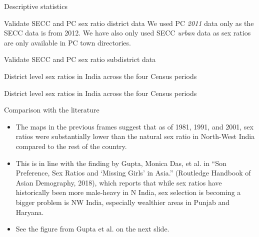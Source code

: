 \documentclass[aspectratio=169]{beamer}
\begin{document}
\begin{section}{Descriptive statistics}
  \begin{frame}{Validate SECC and PC sex ratio district data}
    \small{We used PC \emph{2011} data only as the SECC data is from 2012. We
    have also only used SECC \emph{urban} data as sex ratios are only
    available in PC town directories.}
    \centering
  \end{frame}
  \begin{frame}{Validate SECC and PC sex ratio subdistrict data}
    \centering
  \end{frame}

\begin{frame}{District level sex ratios in India across the four Census periods}
  \centering
  \end{frame}
\begin{frame}{District level sex ratios in India across the four Census periods}
  \centering
\end{frame}

\begin{frame}{Comparison with the literature}
  \begin{itemize}
    \item The maps in the previous frames suggest that as of 1981, 1991, and
  2001, sex ratios were substantially lower than the natural sex ratio
  in North-West India compared to the rest of the country.
  \item This is in line with the finding by Gupta, Monica Das, et al. in “Son Preference,
  Sex Ratios and ‘Missing Girls’ in Asia.” (Routledge Handbook of Asian
  Demography, 2018), which reports that while sex ratios have
  historically been more male-heavy in N India, sex selection is
  becoming a bigger problem is NW India, especially wealthier areas in
  Punjab and Haryana.
  \item See the figure from Gupta et al. on the next slide.
   \end{itemize}
\end{frame}


\end{section}
\end{document}
